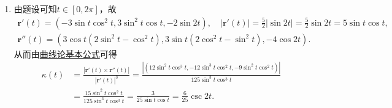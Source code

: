\documentclass[../../main.tex]{subfiles}%
\begin{document}
\begin{solution}
\begin{enumerate}[(1)]
\begin{align*}
\bm{r}'(t) = \left(a-a\cos t, a\sin t, b\right), \quad \bm{r}''(t) = \left(a\sin t, a\cos t, 0\right), \quad |\bm{r}'(t)| = \left(2a^2\left(1-\cos t\right)+b^2\right)^{\frac{1}{2}}.
\end{align*}
从而由\hyperref[theorem:曲线论基本公式]{曲线论基本公式}可得
\begin{align*}
\kappa(t) = \frac{|\bm{r}'(t) \times \bm{r}''(t)|}{|\bm{r}'(t)|^3} = \frac{\left| \left( -ab\cos t, ab\sin t, a^2\left(\cos t-1\right) \right) \right|}{\left(2a^2\left(1-\cos t\right)+b^2\right)^{\frac{3}{2}}} = \frac{a\sqrt{b^2+a^2\left(\cos t-1\right)^2}}{\left(2a^2\left(1-\cos t\right)+b^2\right)^{\frac{3}{2}}}.
\end{align*}
\item 由题设可知$t\in\left[0,2\pi\right]$，故
\begin{gather*}
\bm{r}'(t) = \left(-3\sin t\cos^2 t, 3\sin^2 t\cos t, -2\sin 2t\right), \quad |\bm{r}'(t)| = \frac{5}{2}|\sin 2t| = \frac{5}{2}\sin 2t = 5\sin t\cos t, \\
\bm{r}''(t) = \left(3\cos t\left(2\sin^2 t-\cos^2 t\right), 3\sin t\left(2\cos^2 t-\sin^2 t\right), -4\cos 2t\right).
\end{gather*}
从而由\hyperref[theorem:曲线论基本公式]{曲线论基本公式}可得
\begin{align*}
\kappa(t) &= \frac{|\bm{r}'(t) \times \bm{r}''(t)|}{|\bm{r}'(t)|^3} = \frac{\left| \left( 12\sin^2 t\cos^3 t, -12\sin^3 t\cos^2 t, -9\sin^2 t\cos^2 t \right) \right|}{125\sin^3 t\cos^3 t} \\
&= \frac{15\sin^2 t\cos^2 t}{125\sin^3 t\cos^3 t} = \frac{3}{25\sin t\cos t} = \frac{6}{25}\csc 2t.
\end{align*}
\end{enumerate}

\end{solution}
\end{document}
